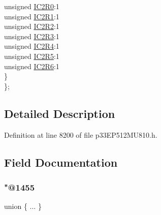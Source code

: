 \begin{DoxyCompactItemize}
\begin{tabbing}
\>\>unsigned \hyperlink{structtag_r_p_i_n_r7_b_i_t_s_aac1b34c4304ed9c6c30403192e52f3f2}{IC2R0}:1\\
\>\>unsigned \hyperlink{structtag_r_p_i_n_r7_b_i_t_s_aa8d11ef2723d42c780b2e2ffa3ad2cc0}{IC2R1}:1\\
\>\>unsigned \hyperlink{structtag_r_p_i_n_r7_b_i_t_s_ad646b9c4562c501047d9f8854567c739}{IC2R2}:1\\
\>\>unsigned \hyperlink{structtag_r_p_i_n_r7_b_i_t_s_a00c27edff7051d84cd2b90cdff5a0b27}{IC2R3}:1\\
\>\>unsigned \hyperlink{structtag_r_p_i_n_r7_b_i_t_s_a1716c4dd25140a53c28843adc175f5da}{IC2R4}:1\\
\>\>unsigned \hyperlink{structtag_r_p_i_n_r7_b_i_t_s_a902a0c5d364b83b492c37e7d483540a3}{IC2R5}:1\\
\>\>unsigned \hyperlink{structtag_r_p_i_n_r7_b_i_t_s_a2230453bf7bad40f2b9c7a8f7a8973e2}{IC2R6}:1\\
\>\} \\
\}; \\

\end{tabbing}\end{DoxyCompactItemize}


\subsection{Detailed Description}


Definition at line 8200 of file p33\+E\+P512\+M\+U810.\+h.



\subsection{Field Documentation}
\mbox{\label{structtag_r_p_i_n_r7_b_i_t_s_a6958706002405b3d700c313bdcc53639}} 
\subsubsection{\texorpdfstring{"@1455}{@1455}}
{\footnotesize\ttfamily union \{ ... \} }

\mbox{\label{structtag_r_p_i_n_r7_b_i_t_s_adf71f3d8410c1f1dbbc96680a92c49af}} 
